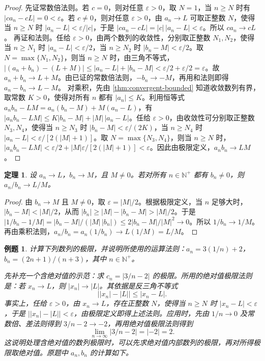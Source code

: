 \documentclass[UTF8,fontset=fandol,11pt]{ctexart}
\newtheorem{theorem}[definition]{定理}
\newtheorem{example}[definition]{例题}
\begin{document}
\begin{proof}
先证常数倍法则。若 $c=0$，则对任意 $\varepsilon>0$，取 $N=1$，当 $n\geq N$ 时有 $|ca_n-cL|=0<\varepsilon$。若 $c\neq0$，则对任意 $\varepsilon>0$，由 $a_n\to L$ 可取正整数 $N$，使得当 $n\geq N$ 时 $|a_n-L|<\varepsilon/|c|$，于是 $|ca_n-cL|=|c|\,|a_n-L|<\varepsilon$。所以 $ca_n\to cL$。
再证和法则。任给 $\varepsilon>0$，由两个数列的收敛性，分别取正整数 $N_1,N_2$，使得当 $n\geq N_1$ 时 $|a_n-L|<\varepsilon/2$，当 $n\geq N_2$ 时 $|b_n-M|<\varepsilon/2$。取 $N=\max\{N_1,N_2\}$，则当 $n\geq N$ 时，由三角不等式，$|(a_n+b_n)-(L+M)|\leq|a_n-L|+|b_n-M|<\varepsilon/2+\varepsilon/2=\varepsilon$。故 $a_n+b_n\to L+M$。由已证的常数倍法则，$-b_n\to-M$，再用和法则即得 $a_n-b_n\to L-M$。
对乘积，先由 \ref{thm:convergent-bounded} 知道收敛数列有界，取常数 $K>0$，使得对所有 $n$ 都有 $|a_n|\leq K$。利用恒等式 $a_nb_n-LM=a_n(b_n-M)+M(a_n-L)$，有 $|a_nb_n-LM|\leq K|b_n-M|+|M|\,|a_n-L|$。任给 $\varepsilon>0$，由收敛性可分别取正整数 $N_3,N_4$，使得当 $n\geq N_3$ 时 $|b_n-M|<\varepsilon/(2K)$，当 $n\geq N_4$ 时 $|a_n-L|<\varepsilon/[2(|M|+1)]$。取 $N=\max\{N_3,N_4\}$，则当 $n\geq N$ 时，$|a_nb_n-LM|<\varepsilon/2+|M|\varepsilon/[2(|M|+1)]<\varepsilon$。因此由极限定义，$a_nb_n\to LM$。
\end{proof}
\begin{theorem}
\label{thm:limit-quotient}设 $a_n\to L$，$b_n\to M$，且 $M\neq0$。若对所有 $n\in\mathbb{N}^{+}$ 都有 $b_n\neq0$，则 $a_n/b_n\to L/M$。
\end{theorem}
\begin{proof}
由 $b_n\to M$ 且 $M\neq0$，取 $\varepsilon=|M|/2$。根据极限定义，当 $n$ 足够大时，$|b_n-M|<|M|/2$，从而 $|b_n|\geq|M|-|b_n-M|>|M|/2$。于是 $|1/b_n-1/M|=|b_n-M|/(|M|\,|b_n|)\leq2|b_n-M|/|M|^2\to0$。所以 $1/b_n\to1/M$。再由乘积法则，$a_n/b_n=a_n(1/b_n)\to L(1/M)=L/M$。
\end{proof}
\begin{example}
计算下列数列的极限，并说明所使用的运算法则：$a_n=3(1/n)+2$，$b_n=(2n+1)/(n+3)$，其中 $n\in\mathbb{N}^{+}$。

先补充一个含绝对值的示范：求 $c_n=|3/n-2|$ 的极限。所用的绝对值极限法则是：若 $x_n\to L$，则 $|x_n|\to|L|$。其依据是反三角不等式
\[
\bigl||x_n|-|L|\bigr|\leq|x_n-L|.
\]
事实上，任给 $\varepsilon>0$，由 $x_n\to L$，存在正整数 $N$，使得当 $n\geq N$ 时 $|x_n-L|<\varepsilon$，于是 $\bigl||x_n|-|L|\bigr|<\varepsilon$，由极限定义即得上述法则。应用时，先由 $1/n\to0$ 及常数倍、差法则得到 $3/n-2\to-2$，再用绝对值极限法则得到
\[
\lim_{n\to\infty}|3/n-2|=|-2|=2.
\]
这说明处理含绝对值的数列极限时，可以先求绝对值内部数列的极限，再对所得极限取绝对值。原题中 $a_n,b_n$ 的计算如下。
\end{example}
\end{document}
